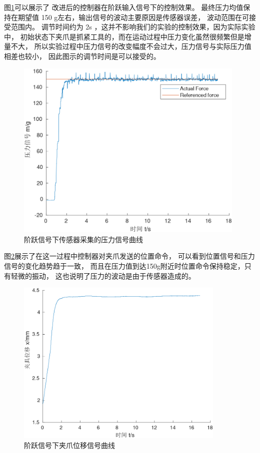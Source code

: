 
图\ref{fig:150}可以展示了 改进后的控制器在阶跃输入信号下的控制效果。
最终压力均值保持在期望值 150 g左右，输出信号的波动主要原因是传感器误差，
波动范围在可接受范围内。
调节时间约为 2s ，这并不影响我们的实验的控制效果，因为实际实验中，
初始状态下夹爪是抓紧工具的，而在运动过程中压力变化虽然很频繁但是增量不大，
所以实验过程中压力信号的改变幅度不会过大，压力信号与实际压力值相差也较小，
因此图示的调节时间是可以接受的。

\begin{figure}[!ht]
  \centering
  \includegraphics[width=11cm]{chapter04/pic/150}
  \caption{\label{fig:150}
    阶跃信号下传感器采集的压力信号曲线}
  \vspace{-0.3cm}
\end{figure}

图\ref{fig:150_x}展示了在这一过程中控制器对夹爪发送的位置命令，
可以看到位置信号和压力信号的变化趋势趋于一致，
而且在压力值到达150g附近时位置命令保持稳定，只有轻微的振动，
这也说明了压力的波动是由于传感器造成的。

\begin{figure}[!ht]
  \centering
  \includegraphics[width=10cm]{chapter04/pic/150_x}
  \caption{\label{fig:150_x}
    阶跃信号下夹爪位移信号曲线}
  \vspace{-0.3cm}
\end{figure}



